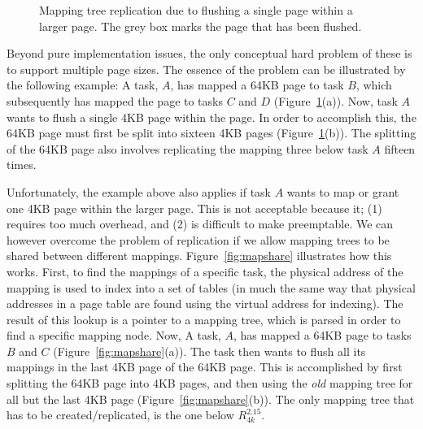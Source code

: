 \documentclass[a4paper,10pt,twoside]{article}
\begin{document}
\begin{figure}[tbp]
  \begin{center}
    \label{fig:mapsplit-1}%
    \hspace{1cm}%
    \label{fig:mapsplit-2}%
    \caption{Mapping tree replication due to flushing a
      single page within a larger page.  The grey box marks the page
      that has been flushed.}
    \label{fig:mapsplit}
  \end{center}
\end{figure}

Beyond pure implementation issues, the only conceptual hard problem of
these is to support multiple page sizes.  The essence of the problem
can be illustrated by the following example: A task, $A$, has mapped a
64KB page to task $B$, which subsequently has mapped the page to tasks
$C$ and $D$ (Figure~\ref{fig:mapsplit}(a)).  Now, task $A$ wants to
flush a single 4KB page within the page.  In order to accomplish this,
the 64KB page must first be split into sixteen 4KB pages
(Figure~\ref{fig:mapsplit}(b)).  The splitting of the 64KB page also
involves replicating the mapping three below task $A$ fifteen times.

Unfortunately, the example above also applies if task $A$ wants to map
or grant one 4KB page within the larger page.  This is not acceptable
because it; (1) requires too much overhead, and (2) is difficult to
make preemptable.  We can however overcome the problem of replication
if we allow mapping trees to be shared between different mappings.
Figure~\ref{fig:mapshare} illustrates how this works.  First, to find
the mappings of a specific task, the physical address of the mapping
is used to index into a set of tables (in much the same way that
physical addresses in a page table are found using the virtual address
for indexing).  The result of this lookup is a pointer to a mapping
tree, which is parsed in order to find a specific mapping node.  Now,
A task, $A$, has mapped a 64KB page to tasks $B$ and $C$
(Figure~\ref{fig:mapshare}(a)).  The task then wants to flush all its
mappings in the last 4KB page of the 64KB page.  This is accomplished
by first splitting the 64KB page into 4KB pages, and then using the
\emph{old} mapping tree for all but the last 4KB page
(Figure~\ref{fig:mapshare}(b)).  The only mapping tree that has to be
created/replicated, is the one below $R^{2.15}_{4k}$.
\end{document}
